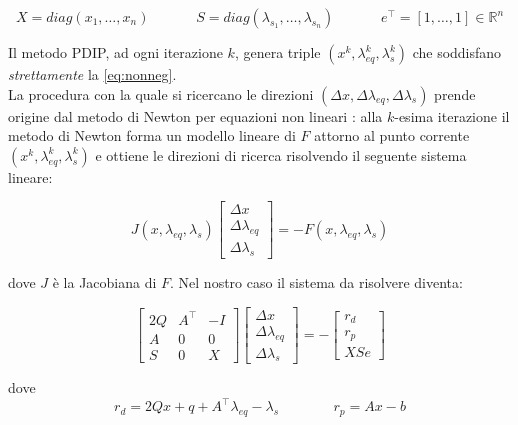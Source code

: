 \begin{equation} \label{eq:xs}
    X = diag(x_1, \dots, x_n) \;\;\;\;\;\;\;\;\;\;\;\; 
    S = diag(\lambda_{s_1}, \dots, \lambda_{s_n}) \;\;\;\;\;\;\;\;\;\;\;\; 
    e^\intercal = [1, \dots, 1] \in \mathbb{R}^n
\end{equation}

Il metodo PDIP, ad ogni iterazione $k$, genera triple $(x^k, \lambda_{eq}^k, \lambda_{s}^k)$ 
che soddisfano \emph{strettamente} la \ref{eq:nonneg}.\\
La procedura con la quale si ricercano le direzioni $(\Delta x, \Delta \lambda_{eq}, \Delta \lambda_s)$ 
prende origine dal metodo di Newton per equazioni non lineari \cite{Nocedal2006Numerical}: 
alla $k$-esima iterazione il metodo di Newton forma un modello lineare di $F$ 
attorno al punto corrente $(x^k, \lambda_{eq}^k, \lambda_{s}^k)$ e ottiene 
le direzioni di ricerca risolvendo il seguente sistema lineare:

\begin{equation} \label{eq:J}
J(x, \lambda_{eq}, \lambda_s) \begin{bmatrix}
\Delta x \\ \Delta \lambda_{eq}\\ \Delta \lambda_s
\end{bmatrix} = -F(x, \lambda_{eq}, \lambda_{s})
\end{equation}

dove $J$ è la Jacobiana di $F$. Nel nostro caso il sistema da risolvere diventa:

\begin{equation} \label{eq:defKKT}
\begin{bmatrix}
2Q & A^\intercal & -I\\
A & 0 & 0 \\
S & 0 & X
\end{bmatrix}\begin{bmatrix}\Delta x \\ \Delta \lambda_{eq} \\ \Delta \lambda_{s} \end{bmatrix}= -
\begin{bmatrix}
    r_d\\r_p\\XSe
\end{bmatrix}
\end{equation}

dove
\begin{equation} \label{eq:res}
    r_d=2Qx +q + A^\intercal \lambda_{eq} -\lambda_s \;\;\;\;\;\;\;\;\;\;\;\;\;\; r_p=Ax-b
\end{equation}

